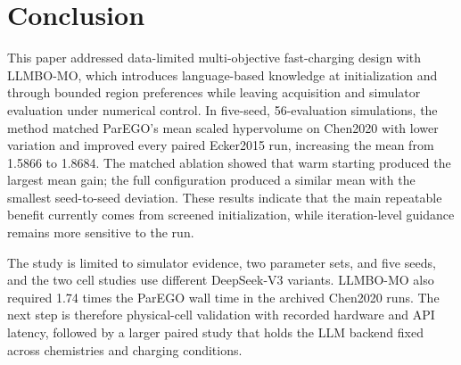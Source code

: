 \documentclass[journal]{IEEEtran}
\begin{document}
\raggedbottom
\section{Conclusion}
\label{sec:conclusion}

This paper addressed data-limited multi-objective fast-charging design with LLMBO-MO, which introduces language-based knowledge at initialization and through bounded region preferences while leaving acquisition and simulator evaluation under numerical control. In five-seed, 56-evaluation simulations, the method matched ParEGO's mean scaled hypervolume on Chen2020 with lower variation and improved every paired Ecker2015 run, increasing the mean from 1.5866 to 1.8684. The matched ablation showed that warm starting produced the largest mean gain; the full configuration produced a similar mean with the smallest seed-to-seed deviation. These results indicate that the main repeatable benefit currently comes from screened initialization, while iteration-level guidance remains more sensitive to the run.

The study is limited to simulator evidence, two parameter sets, and five seeds, and the two cell studies use different DeepSeek-V3 variants. LLMBO-MO also required 1.74 times the ParEGO wall time in the archived Chen2020 runs. The next step is therefore physical-cell validation with recorded hardware and API latency, followed by a larger paired study that holds the LLM backend fixed across chemistries and charging conditions.
\end{document}
